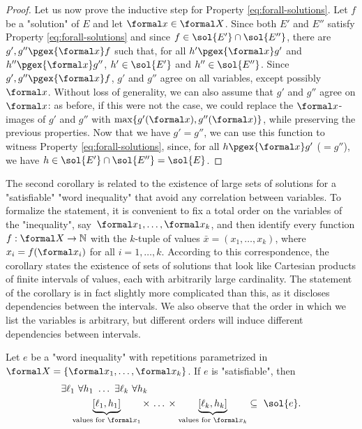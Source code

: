 \documentclass{theoretics}
\begin{document}
\begin{proof}
Let us now prove the inductive step for Property \eqref{eq:forall-solutions}.
Let $f$ be a "solution" of $E$ and let $\formal x\in\formal X$.
Since both $E'$ and $E''$ satisfy Property \eqref{eq:forall-solutions} 
and since $f\in\sol{E'} \cap \sol{E''}$, there are 
$g',g'' \pgex{\formal x} f$ such that, 
for all $h' \pgex{\formal x} g'$ and $h'' \pgex{\formal x} g''$,
$h'\in\sol{E'}$ and $h''\in\sol{E''}$.
Since $g',g'' \pgex{\formal x} f$, 
$g'$ and $g''$ agree on all variables, except possibly $\formal x$.
Without loss of generality, we can also assume that $g'$ and $g''$ 
agree on $\formal x$: as before, if this were not the case, 
we could replace the $\formal x$-images of $g'$ and $g''$ with 
$\max\{g'(\formal x),g''(\formal x)\}$, while preserving the previous properties. 
Now that we have $g'=g''$, we can use this function to witness
Property \eqref{eq:forall-solutions}, since, for all $h \pgex{\formal x} g'$ ($ = g''$),
we have $h\in \sol{E'} \cap \sol{E''} = \sol{E}$.
\end{proof}



The second corollary is related to the existence of large sets of 
solutions for a "satisfiable" "word inequality" that avoid any 
correlation between variables. 
To formalize the statement, it is convenient to fix a total order 
on the variables of the "inequality", 
say~$\formal x_1,\dots,\formal x_k$,
and then identify every function $f:\formal X\rightarrow\mathbb{N}$ 
with the $k$-tuple of values $\bar x = (x_1,\dots,x_k)$, where 
$x_i = f(\formal x_i)$ for all $i=1,\dots,k$.
According to this correspondence, the corollary states the existence 
of sets of solutions that look like Cartesian products of finite
intervals of values, each with arbitrarily large cardinality.
The statement of the corollary is in fact slightly more complicated 
than this, as it discloses dependencies between the intervals.
We also observe that the order in which we list the variables 
is arbitrary, but different orders will induce different 
dependencies between intervals.


\begin{corollary}\label{cor:saarela2}
Let $e$ be a "word inequality" with repetitions parametrized in 
$\formal X = \{\formal x_1,\dots,\formal x_k\}$.
If $e$ is "satisfiable", then 
\begin{align*}
  & \exists \ell_1 ~ \forall h_1 ~ \dots ~ \exists \ell_k ~ \forall h_k \\
  & \quad
  \underbrace{[\ell_1,h_1]}_{\text{values for }\formal x_1}
  \times \, \dots \, \times
  \underbrace{[\ell_k,h_k]}_{\text{values for }\formal x_k} 
  \subseteq~ \sol{e}.
\end{align*}
\end{corollary}
\end{document}
